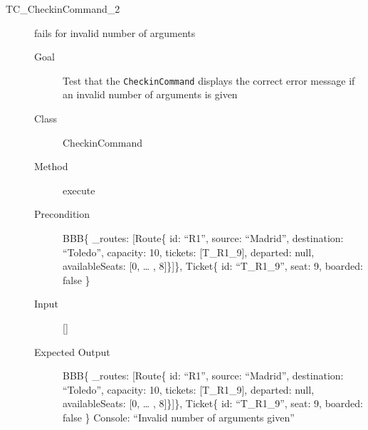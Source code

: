 \documentclass[11pt]{article}
\begin{document}
\begin{description}
\item[{TC\_CheckinCommand\_2}] fails for invalid number of arguments
\begin{description}
\item[{Goal}] Test that the \texttt{CheckinCommand} displays the correct error message if an invalid number of arguments is given
\item[{Class}] CheckinCommand
\item[{Method}] execute
\item[{Precondition}] BBB\{ \_routes: [Route\{ id: “R1”, source: “Madrid”, destination: “Toledo”, capacity: 10,  tickets: [T\_R1\_9], departed: null, availableSeats: [0, … , 8]\}]\}, Ticket\{ id: “T\_R1\_9”, seat: 9, boarded: false \}
\item[{Input}] []
\item[{Expected Output}] BBB\{ \_routes: [Route\{ id: “R1”, source: “Madrid”, destination: “Toledo”, capacity: 10,  tickets: [T\_R1\_9], departed: null, availableSeats: [0, … , 8]\}]\}, Ticket\{ id: “T\_R1\_9”, seat: 9, boarded: false \}
Console: “Invalid number of arguments given”
\end{description}
\end{description}
\end{document}
